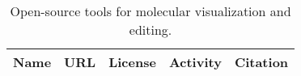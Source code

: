 \begin{table} 
    \begin{tabular}{ l l c c c  }
    Name & URL & License & Activity & Citation \\ \hline
    \end{tabular} 
    \caption{\label{3ddesktopviz} Open-source tools for molecular visualization and editing.}
\end{table}